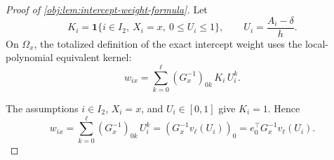 \begin{proof}[Proof of \cref{obj:lem:intercept-weight-formula}]
Let
\[
K_i=\mathbf 1\{i\in I_2,\ X_i=x,\ 0\le U_i\le1\},
\qquad
U_i=\frac{A_i-\delta}{h}.
\]
On \(\Omega_x\), the totalized definition of the exact intercept weight uses the local-polynomial equivalent kernel:
\[
w_{ix}
=
\sum_{k=0}^{\ell}(G_x^{-1})_{0k}\,K_i\,U_i^k .
\]

The assumptions \(i\in I_2\), \(X_i=x\), and \(U_i\in[0,1]\) give \(K_i=1\).  Hence
\[
w_{ix}
=
\sum_{k=0}^{\ell}(G_x^{-1})_{0k}\,U_i^k
=
\left(G_x^{-1}v_\ell(U_i)\right)_0
=
e_0^\top G_x^{-1}v_\ell(U_i).
\]
\end{proof}
